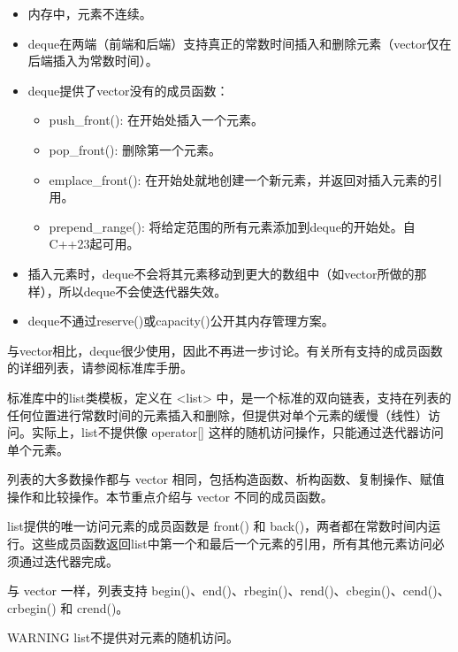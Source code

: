 \begin{itemize}
\item
内存中，元素不连续。

\item
deque在两端（前端和后端）支持真正的常数时间插入和删除元素（vector仅在后端插入为常数时间）。

\item
deque提供了vector没有的成员函数：
\begin{itemize}
\item
push\_front(): 在开始处插入一个元素。

\item
pop\_front(): 删除第一个元素。

\item
emplace\_front(): 在开始处就地创建一个新元素，并返回对插入元素的引用。

\item
prepend\_range(): 将给定范围的所有元素添加到deque的开始处。自C++23起可用。
\end{itemize}

\item
插入元素时，deque不会将其元素移动到更大的数组中（如vector所做的那样），所以deque不会使迭代器失效。

\item
deque不通过reserve()或capacity()公开其内存管理方案。
\end{itemize}

与vector相比，deque很少使用，因此不再进一步讨论。有关所有支持的成员函数的详细列表，请参阅标准库手册。


标准库中的list类模板，定义在 <list> 中，是一个标准的双向链表，支持在列表的任何位置进行常数时间的元素插入和删除，但提供对单个元素的缓慢（线性）访问。实际上，list不提供像 operator[] 这样的随机访问操作，只能通过迭代器访问单个元素。

列表的大多数操作都与 vector 相同，包括构造函数、析构函数、复制操作、赋值操作和比较操作。本节重点介绍与 vector 不同的成员函数。


list提供的唯一访问元素的成员函数是 front() 和 back()，两者都在常数时间内运行。这些成员函数返回list中第一个和最后一个元素的引用，所有其他元素访问必须通过迭代器完成。

与 vector 一样，列表支持 begin()、end()、rbegin()、rend()、cbegin()、cend()、crbegin() 和 crend()。

\begin{myWarning}{WARNING}
list不提供对元素的随机访问。
\end{myWarning}

